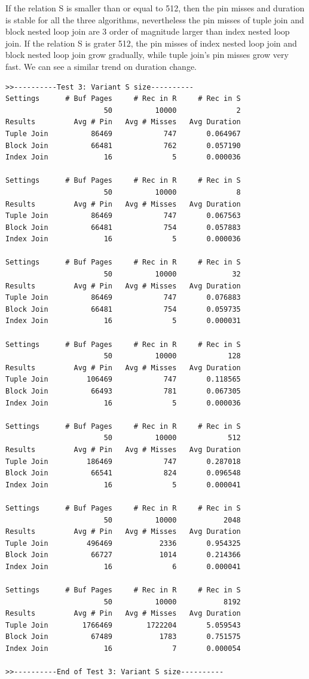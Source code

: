 \documentclass{article}
\begin{document}
If the relation S is smaller than or equal to 512, then the pin misses and duration is stable for all the three algorithms, nevertheless the pin misses of tuple join and block nested loop join are 3 order of magnitude larger than index nested loop join. If the relation S is grater 512, the pin misses of index nested loop join and block nested loop join grow gradually, while tuple join's pin misses grow very fast. We can see a similar trend on duration change. 

\begin{verbatim}
>>----------Test 3: Variant S size----------
Settings      # Buf Pages     # Rec in R     # Rec in S
                       50          10000              2
Results         Avg # Pin   Avg # Misses   Avg Duration
Tuple Join          86469            747       0.064967
Block Join          66481            762       0.057190
Index Join             16              5       0.000036

Settings      # Buf Pages     # Rec in R     # Rec in S
                       50          10000              8
Results         Avg # Pin   Avg # Misses   Avg Duration
Tuple Join          86469            747       0.067563
Block Join          66481            754       0.057883
Index Join             16              5       0.000036

Settings      # Buf Pages     # Rec in R     # Rec in S
                       50          10000             32
Results         Avg # Pin   Avg # Misses   Avg Duration
Tuple Join          86469            747       0.076883
Block Join          66481            754       0.059735
Index Join             16              5       0.000031

Settings      # Buf Pages     # Rec in R     # Rec in S
                       50          10000            128
Results         Avg # Pin   Avg # Misses   Avg Duration
Tuple Join         106469            747       0.118565
Block Join          66493            781       0.067305
Index Join             16              5       0.000036

Settings      # Buf Pages     # Rec in R     # Rec in S
                       50          10000            512
Results         Avg # Pin   Avg # Misses   Avg Duration
Tuple Join         186469            747       0.287018
Block Join          66541            824       0.096548
Index Join             16              5       0.000041

Settings      # Buf Pages     # Rec in R     # Rec in S
                       50          10000           2048
Results         Avg # Pin   Avg # Misses   Avg Duration
Tuple Join         496469           2336       0.954325
Block Join          66727           1014       0.214366
Index Join             16              6       0.000041

Settings      # Buf Pages     # Rec in R     # Rec in S
                       50          10000           8192
Results         Avg # Pin   Avg # Misses   Avg Duration
Tuple Join        1766469        1722204       5.059543
Block Join          67489           1783       0.751575
Index Join             16              7       0.000054

>>----------End of Test 3: Variant S size----------
\end{verbatim}
\end{document}
